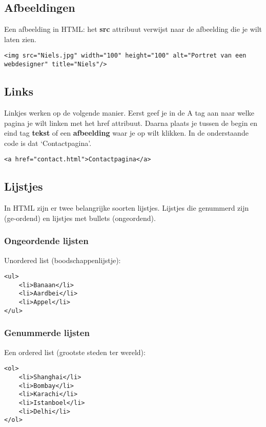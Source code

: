 \documentclass[8pt,pagesize,footinclude=false,headinclude=false]{scrartcl}
\begin{document}
\begin{multicols*}{4}
\subsection*{Afbeeldingen}
Een afbeelding in HTML: het \textbf{src} attribuut verwijst naar de afbeelding die je wilt laten zien.
\begin{lstlisting}[language=HTML5]
<img src="Niels.jpg" width="100" height="100" alt="Portret van een webdesigner" title="Niels"/>
\end{lstlisting}

\subsection*{Links}
Linkjes werken op de volgende manier. Eerst geef je in de A tag aan naar welke pagina je wilt linken met het href attribuut. Daarna plaats je tussen de begin en eind tag \textbf{tekst} of een \textbf{afbeelding} waar je op wilt klikken. In de onderstaande code is dat `Contactpagina'.

\begin{lstlisting}[language=HTML5]
<a href="contact.html">Contactpagina</a>
\end{lstlisting}

\subsection*{Lijstjes}
In HTML zijn er twee belangrijke soorten lijstjes. Lijstjes die genummerd zijn (ge-ordend) en lijstjes met bullets (ongeordend).

\subsubsection*{Ongeordende lijsten}
Unordered list (boodschappenlijstje): 
\begin{lstlisting}[language=HTML5]
<ul>
	<li>Banaan</li>
	<li>Aardbei</li>
	<li>Appel</li>
</ul>
\end{lstlisting}

\subsubsection*{Genummerde lijsten}
Een ordered list (grootste steden ter wereld):
\begin{lstlisting}[language=HTML5]
<ol>
	<li>Shanghai</li>
	<li>Bombay</li>
	<li>Karachi</li>
	<li>Istanboel</li>
	<li>Delhi</li>
</ol>
\end{lstlisting}


\end{multicols*}
\end{document}
